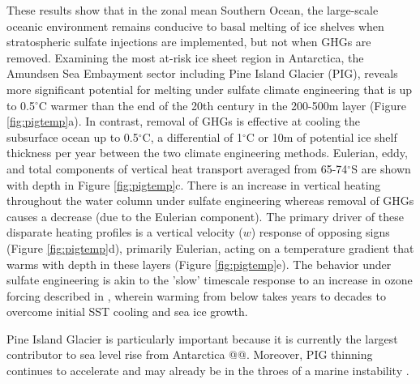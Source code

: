 \documentclass[grl]{AGUTeX}  %
\begin{document}
\begin{article}
These results show that in the zonal mean Southern Ocean, the large-scale oceanic environment remains conducive to basal melting of ice shelves when stratospheric sulfate injections are implemented, but not when GHGs are removed. Examining the most at-risk ice sheet region in Antarctica, the Amundsen Sea Embayment sector including Pine Island Glacier (PIG), reveals more significant potential for melting under sulfate climate engineering that is up to 0.5$^\circ$C warmer than the end of the 20th century in the 200-500m layer (Figure \ref{fig:pigtemp}a). In contrast, removal of GHGs is effective at cooling the subsurface ocean up to 0.5$^\circ$C, a differential of 1$^\circ$C or 10m of potential ice shelf thickness per year between the two climate engineering methods. Eulerian, eddy, and total components of vertical heat transport averaged from 65-74$^\circ$S are shown with depth in Figure \ref{fig:pigtemp}c. There is an increase in vertical heating throughout the water column under sulfate engineering whereas removal of GHGs causes a decrease (due to the Eulerian component). The primary driver of these disparate heating profiles is a vertical velocity ($w$) response of opposing signs (Figure \ref{fig:pigtemp}d), primarily Eulerian, acting on a temperature gradient that warms with depth in these layers (Figure \ref{fig:pigtemp}e). The behavior under sulfate engineering is akin to the 'slow' timescale response to an increase in ozone forcing described in \citet{ferreira14}, wherein warming from below takes years to decades to overcome initial SST cooling and sea ice growth.


Pine Island Glacier is particularly important because it is currently the largest contributor to sea level rise from Antarctica \citep{shepherd12}@@. Moreover, PIG thinning continues to accelerate \citep{rignot08} and may already be in the throes of a marine instability \citep{favier14,rignot14}.




\end{article}
\end{document}
